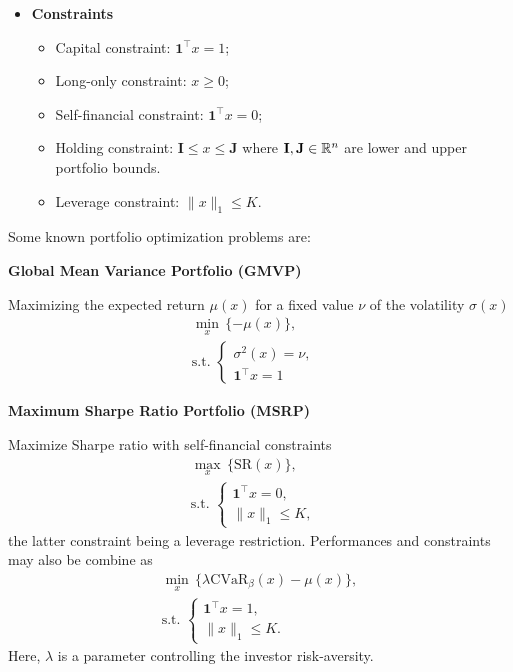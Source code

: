 \begin{itemize}
	\item \textbf{Constraints}
	      \begin{itemize}
		      \item Capital constraint: $\textbf{1}^\top x=1$;
		      \item Long-only constraint: $x\geq0$;
		      \item Self-financial constraint: $\textbf{1}^\top x=0$;
		      \item Holding constraint: $\mathbf{I}\leq x\leq \mathbf{J}$ where $\mathbf{I},\mathbf{J}\in\mathbb{R}^n$ are lower and upper portfolio bounds.
		      \item Leverage constraint: $\|x\|_1\leq K$.
	      \end{itemize}
\end{itemize}

Some known portfolio optimization problems are:

\noindent\textbf{Global Mean Variance Portfolio (GMVP)}

Maximizing the expected return $\mu(x)$ for a fixed value $\nu$ of the volatility $\sigma(x)$
\begin{eqnarray}\label{prob:MVP}
	\min_{x} \, \{- \mu(x)\}, \\
	\mbox{s.t. }\left\{
	\begin{aligned}\nonumber
		\sigma^2(x) = \nu,  & \\
		\mathbf{1}^\top x=1 &
	\end{aligned}
	\right.
\end{eqnarray}

\noindent\textbf{Maximum Sharpe Ratio Portfolio (MSRP)}

Maximize Sharpe ratio with self-financial constraints
\begin{eqnarray*}
	\max_{x} \,\big\{\mbox{SR}(x)\big\}, \\
	\mbox{s.t. }\left\{
	\begin{aligned}\nonumber
		\mathbf{1}^\top x=0, & \\
		\|x\|_1\leq K,
	\end{aligned}
	\right.
\end{eqnarray*}
the latter constraint being a leverage restriction. Performances and constraints may also be combine as
\begin{eqnarray*}
	\min_{x} \,\big\{\lambda \mbox{CVaR}_\beta(x) - \mu(x)\big\}, \\
	\mbox{s.t. }\left\{
	\begin{aligned}\nonumber
		\mathbf{1}^\top x=1, & \\
		\|x\|_1\leq K.
	\end{aligned}
	\right.
\end{eqnarray*}
Here, $\lambda$ is a parameter controlling the investor risk-aversity.

